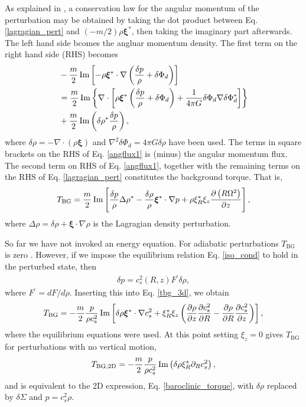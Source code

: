 As explained in \cite{lin11b}, a conservation law for the angular
momentum of the perturbation may be obtained by taking the dot product
between Eq. \ref{lagragian_pert} and $(-m/2)\rho\bm{\xi}^*$, then
taking the imaginary part afterwards. The left hand side bcomes the
angluar momentum density. The first term on the right hand side (RHS)
becomes 
\begin{align}\label{angflux1}
  &-\frac{m}{2}\operatorname{Im}\left[-\rho\bm{\xi}^*\cdot\nabla\left(\frac{\delta p}{\rho} + \delta
    \Phi_d\right)\right] \notag\\ 
&= \frac{m}{2}\operatorname{Im}\left\{\nabla\cdot\left[\rho\bm{\xi}^*\left(\frac{\delta p}{\rho} + \delta
    \Phi_d \right) + \frac{1}{4\pi
    G}\delta\Phi_d\nabla\delta\Phi_d^*\right]\right\} \notag\\
&+ \frac{m}{2}\operatorname{Im}\left(\delta\rho^*\frac{\delta p}{\rho}\right),
\end{align}
where $\delta\rho = - \nabla\cdot\left(\rho\bm{\xi}\right)$ and
$\nabla^2\delta\Phi_d = 4\pi G \delta \rho$ have been used. The 
terms in square brackets on the RHS of Eq. \ref{angflux1} is (minus) the 
angular momentum flux. The second term on RHS of Eq. \ref{angflux1}, 
together with the remaining terms on the RHS of 
Eq. \ref{lagragian_pert} constitutes the background torque. That is, 
\begin{align}\label{tbg_3d}
  T_\mathrm{BG} = \frac{m}{2}\operatorname{Im}\left[
    \frac{\delta p}{\rho} \Delta\rho^* -
    \frac{\delta\rho}{\rho}\bm{\xi}^*\cdot\nabla p  
    + \rho \xi_R^*\xi_z\frac{\partial\left(R\Omega^2\right)}{\partial z}\right],
\end{align}
where $\Delta\rho = \delta\rho + \bm{\xi}\cdot\nabla\rho$ is the
Lagragian density perturbation. 

So far we have not invoked an energy equation. For 
adiabatic perturbations $T_\mathrm{BG}$ is zero
\citep{lin93b}. However, if we impose the equilibrium relation
Eq. \ref{iso_cond} to hold in the perturbed state, then
\begin{align}
  \delta p = c_s^2(R,z) F^\prime \delta\rho,
\end{align}
where $F^\prime = dF/d\rho$. Inserting this into Eq. \ref{tbg_3d}, we
obtain
\begin{align}\label{tbg_3d_2}
  T_\mathrm{BG} = -\frac{m}{2}\frac{p}{\rho
    c_s^2}\operatorname{Im}\left[\delta\rho\bm{\xi}^*\cdot\nabla c_s^2 +
    \xi_R^*\xi_z \left(\frac{\partial\rho}{\partial z}\frac{\partial c_s^2}{\partial R} -
      \frac{\partial\rho}{\partial R}\frac{\partial c_s^2}{\partial z}\right)\right],
\end{align}
where the equilibrium equations were used. 
At this point setting $\xi_z=0$ gives $T_\mathrm{BG}$ for
perturbations with no vertical motion, 
\begin{align}
  T_\mathrm{BG,2D} = -\frac{m}{2}\frac{p}{\rho
    c_s^2}\operatorname{Im}\left(\delta\rho \xi_R^*  \partial_R c_s^2 \right),
\end{align}
and is equivalent to the 2D
expression, Eq. \ref{baroclinic_torque}, with $\delta\rho $ replaced
by $\delta \Sigma$ and $p=c_s^2\rho$. %



